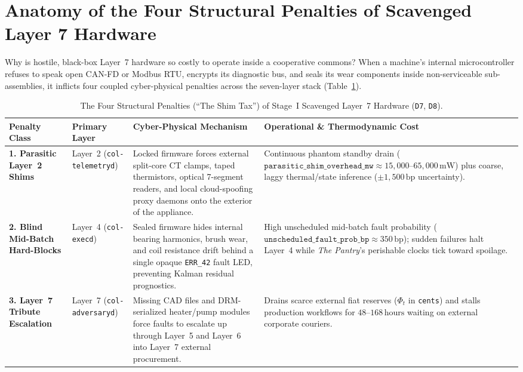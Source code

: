 \section{Anatomy of the Four Structural Penalties of Scavenged Layer 7 Hardware}
\label{sec:l2-four-penalties-shim-tax}

Why is hostile, black-box Layer~7 hardware so costly to operate inside a cooperative commons? When a machine's internal microcontroller refuses to speak open CAN-FD or Modbus RTU, encrypts its diagnostic bus, and seals its wear components inside non-serviceable sub-assemblies, it inflicts four coupled cyber-physical penalties across the seven-layer stack (Table~\ref{tab:l2-four-shim-penalties}).

\begin{table}[htbp]
\centering
\caption{The Four Structural Penalties (``The Shim Tax'') of Stage~I Scavenged Layer~7 Hardware (\texttt{D7}, \texttt{D8}).}
\label{tab:l2-four-shim-penalties}
\footnotesize
\begin{tabular}{@{}p{2.7cm}p{2.3cm}p{4.3cm}p{4.4cm}@{}}
\toprule
\textbf{Penalty Class} & \textbf{Primary Layer} & \textbf{Cyber-Physical Mechanism} & \textbf{Operational \& Thermodynamic Cost} \\
\midrule
\textbf{1. Parasitic Layer~2 Shims} & Layer~2 (\texttt{col-telemetryd}) & Locked firmware forces external split-core CT clamps, taped thermistors, optical 7-segment readers, and local cloud-spoofing proxy daemons onto the exterior of the appliance. & Continuous phantom standby drain ($\mathtt{parasitic\_shim\_overhead\_mw} \approx 15{,}000\text{--}65{,}000\,\mathrm{mW}$) plus coarse, laggy thermal/state inference ($\pm 1{,}500\,\mathrm{bp}$ uncertainty). \\
\addlinespace[3pt]
\textbf{2. Blind Mid-Batch Hard-Blocks} & Layer~4 (\texttt{col-execd}) & Sealed firmware hides internal bearing harmonics, brush wear, and coil resistance drift behind a single opaque \texttt{ERR\_42} fault LED, preventing Kalman residual prognostics. & High unscheduled mid-batch fault probability ($\mathtt{unscheduled\_fault\_prob\_bp} \approx 350\,\mathrm{bp}$); sudden failures halt Layer~4 while \textit{The Pantry}'s perishable clocks tick toward spoilage. \\
\addlinespace[3pt]
\textbf{3. Layer~7 Tribute Escalation} & Layer~7 (\texttt{col-adversaryd}) & Missing CAD files and DRM-serialized heater/pump modules force faults to escalate up through Layer~5 and Layer~6 into Layer~7 external procurement. & Drains scarce external fiat reserves ($\Phi_t$ in \texttt{cents}) and stalls production workflows for $48\text{--}168\,\mathrm{hours}$ waiting on external corporate couriers. \\

\end{tabular}
\end{table}

